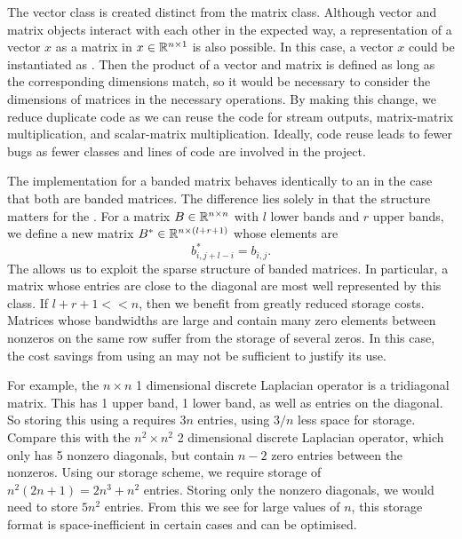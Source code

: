The vector class is created distinct from the matrix class.
Although vector and matrix objects interact with each other in the expected way, a representation of a vector $x$ as a matrix in $x\in\mathbb{R}^{n\times 1}$ is also possible.
In this case, a vector $x$ could be instantiated as .
Then the product of a vector and matrix is defined as long as the corresponding dimensions match, so it would be necessary to consider the dimensions of matrices in the necessary operations.
By making this change, we reduce duplicate code as we can reuse the code for stream outputs, matrix-matrix multiplication, and scalar-matrix multiplication.
Ideally, code reuse leads to fewer bugs as fewer classes and lines of code are involved in the project.


The  implementation for a banded matrix behaves identically to an  in the case that both are banded matrices.
The difference lies solely in that the structure matters for the .
For a matrix $B\in\mathbb{R}^{n\times n}$ with $l$ lower bands and $r$ upper bands, we define a new matrix $B^*\in\mathbb{R}^{n \times (l+r+1)}$ whose elements are
\[
    b^*_{i,j+l-i} = b_{i,j}.
\]
The  allows us to exploit the sparse structure of banded matrices.
In particular, a matrix whose entries are close to the diagonal are most well represented by this class. 
If $l+r+1 << n$, then we benefit from greatly reduced storage costs.
Matrices whose bandwidths are large and contain many zero elements between nonzeros on the same row suffer from the storage of several zeros.
In this case, the cost savings from using an  may not be sufficient to justify its use.

For example, the $n\times n$ 1 dimensional discrete Laplacian operator is a tridiagonal matrix. 
This has 1 upper band, 1 lower band, as well as entries on the diagonal.
So storing this using a  requires $3n$ entries, using $3/n$ less space for storage.
Compare this with the $n^2\times n^2$ 2 dimensional discrete Laplacian operator, which only has 5 nonzero diagonals, but contain $n-2$ zero entries between the nonzeros.
Using our storage scheme, we require storage of $n^2(2n+1)=2n^3+n^2$ entries. 
Storing only the nonzero diagonals, we would need to store $5n^2$ entries.
From this we see for large values of $n$, this storage format is space-inefficient in certain cases and can be optimised.


